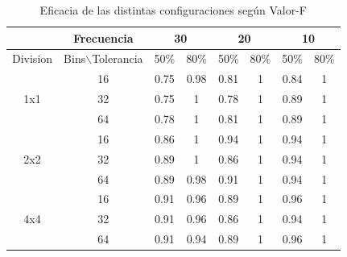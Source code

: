 \documentclass[14pt,letterpaper,hidelinks]{extarticle}
\begin{document}
\begin{table}[]
\centering
\begin{tabular}{c|c|c|c|c|c|c|c|}
\cline{2-8}
 & Frecuencia & \multicolumn{2}{c|}{30} & \multicolumn{2}{c|}{20} & \multicolumn{2}{c|}{10} \\ \hline
\multicolumn{1}{|c|}{Division} & Bins$\backslash$Tolerancia & 50\% & 80\% & 50\% & 80\% & 50\% & 80\% \\ \hline
\multicolumn{1}{|c|}{\multirow{3}{*}{1x1}} & 16 & 0.75 & 0.98 & 0.81 & 1 & 0.84 & 1 \\ \cline{2-8} 
\multicolumn{1}{|c|}{} & 32 & 0.75 & 1 & 0.78 & 1 & 0.89 & 1 \\ \cline{2-8} 
\multicolumn{1}{|c|}{} & 64 & 0.78 & 1 & 0.81 & 1 & 0.89 & 1 \\ \hline
\multicolumn{1}{|c|}{\multirow{3}{*}{2x2}} & 16 & 0.86 & 1 & 0.94 & 1 & 0.94 & 1 \\ \cline{2-8} 
\multicolumn{1}{|c|}{} & 32 & 0.89 & 1 & 0.86 & 1 & 0.94 & 1 \\ \cline{2-8} 
\multicolumn{1}{|c|}{} & 64 & 0.89 & 0.98 & 0.91 & 1 & 0.94 & 1 \\ \hline
\multicolumn{1}{|c|}{\multirow{3}{*}{4x4}} & 16 & 0.91 & 0.96 & 0.89 & 1 & 0.96 & 1 \\ \cline{2-8} 
\multicolumn{1}{|c|}{} & 32 & 0.91 & 0.96 & 0.86 & 1 & 0.94 & 1 \\ \cline{2-8} 
\multicolumn{1}{|c|}{} & 64 & 0.91 & 0.94 & 0.89 & 1 & 0.96 & 1 \\ \hline
\end{tabular}
\captionsetup{justification=centering,margin=2cm}
\caption{Eficacia de las distintas configuraciones según Valor-F\label{tab:eficacia}}
\end{table}
\end{document}
